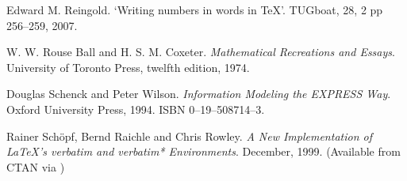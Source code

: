 \begin{thebibliography}{GMS94A}
  Edward M. Reingold.
  \newblock `Writing numbers in words in TeX'.
  \newblock TUGboat, 28, 2 pp 256--259, 2007.

\begin{comment}
\bibitem[RAE71]{ROBINSON71}
  D.~O.~Robinson, M.~Abbamonte and S.~H.~Evans.
  \newblock `Why serifs are important: The perception of small print'.
  \newblock \emph{Visible Language}, pp 353--359, 4, 1971.

\bibitem[Rog43]{ROGERS43}
  Bruce Rogers.
  \newblock \emph{Paragraphs on Printing}.
  \newblock William E. Rudge's Sons, Inc., 1943.
  \newblock (Reissued by Dover, 1979, ISBN 0--486--23817--2)

\bibitem[Rog49]{ROGERS49}
  Bruce Rogers.
  \newblock \emph{Centaur Types}.
  \newblock October House, 1949.
\end{comment}

  W. W. Rouse Ball and H. S. M. Coxeter. 
  \newblock \emph{Mathematical Recreations and Essays}.
  \newblock University of Toronto Press, twelfth edition, 1974.

\begin{comment}
\bibitem[Ryd76]{RYDER}
  John Ryder. 
  \newblock \emph{Printing for Pleasure}. Revised edition.
  \newblock The Bodley Head, 1976.
  \newblock ISBN 0--370--10443--9.
  \newblock (In the USA published by Henry Regenery Co., Michigan, 1977.
             ISBN 0--8092--78103--3)
\end{comment}

  Douglas Schenck and Peter Wilson.
  \newblock \emph{Information Modeling the EXPRESS Way}.
  \newblock Oxford University Press, 1994.
  \newblock ISBN 0--19--508714--3.

  Rainer Sch\"{o}pf, Bernd Raichle and Chris Rowley.
  \newblock \emph{A New Implementation of LaTeX's verbatim
                  and verbatim* Environments}.
  \newblock December, 1999.
  \newblock (Available from CTAN via
            )

\begin{comment}
\bibitem[Sch97]{SCHRIVER97}
  Karen A.~Schriver.
  \newblock \emph{Dynamics in Document Design}.
  \newblock Wiley \& Sons, 1997.

\bibitem[Sme96]{SMEIJERS96}
  Fred Smeijers.
  \newblock \emph{Counterpunch: making type in the sixteenth century,
                  designing typefaces now}.
  \newblock Hyphen Press, London, 1996.
  \newblock ISBN 0--907259--06--5.
\end{comment}



\end{thebibliography}
